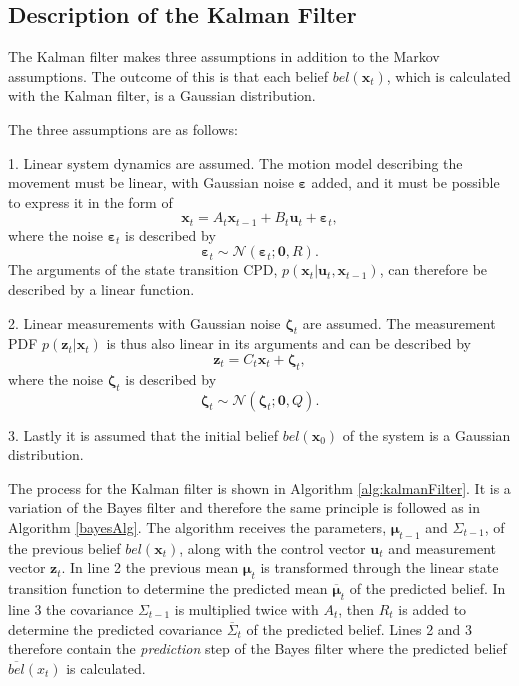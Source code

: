 \documentclass[12pt,oneside,openany,a4paper, %
afrikaans,english,
]{memoir}
\numberwithin{equation}{chapter}
\begin{document}
{\subsection{Description of the Kalman Filter}
The Kalman filter makes three assumptions in addition to the Markov assumptions. The outcome of this is that each belief $bel(\bm{x}_t)$, which is calculated with the Kalman filter, is a Gaussian distribution.

The three assumptions are as follows:

1. Linear system dynamics are assumed. The motion model describing the movement must be linear, with Gaussian noise $\bm{\varepsilon}$ added, and it must be possible to express it in the form of
\begin{equation}\label{eq:linearKmm}
\bm{x}_t = A_t \bm{x}_{t - 1} + B_t \bm{u}_t + \bm{\varepsilon}_t,
\end{equation}
where the noise $\bm{\varepsilon}_t$ is described by 
\begin{equation}
\bm{\varepsilon}_t \sim \mathcal{N}(\bm{\varepsilon}_t; \bm{0}, R).
\end{equation}
The arguments of the state transition CPD, $p(\bm{x}_t|\bm{u}_t, \bm{x}_{t-1})$, can therefore be described by a linear function.

2. Linear measurements with Gaussian noise $\bm{\zeta}_t$ are assumed. The measurement PDF $p(\bm{z}_t|\bm{x}_t)$ is thus also linear in its arguments and can be described by
\begin{equation}
\bm{z}_t = C_t \bm{x}_t + \bm{\zeta}_t,
\end{equation} 
where the noise $\bm{\zeta}_t$ is described by
\begin{equation}\label{eq:linearMeasurements}
\bm{\zeta}_t \sim \mathcal{N}(\bm{\zeta}_t; \bm{0}, Q).
\end{equation}

3. Lastly it is assumed that the initial belief $bel(\bm{x}_0)$ of the system is a Gaussian distribution.

The process for the Kalman filter is shown in Algorithm \ref{alg:kalmanFilter}. It is a variation of the Bayes filter and therefore the same principle is followed as in Algorithm \ref{bayesAlg}. The algorithm receives the parameters, $\bm{\mu}_{t-1}$ and $\Sigma_{t-1}$, of the previous belief $bel(\bm{x}_t)$, along with the control vector $\bm{u}_t$ and measurement vector $\bm{z}_t$. In line 2 the previous mean $\bm{\mu}_t$ is transformed through the linear state transition function to determine the predicted mean $\overline{\bm{\mu}}_t$ of the predicted belief. In line 3 the covariance $\Sigma_{t-1}$ is multiplied twice with $A_t$, then $R_t$ is added to determine the predicted covariance $\overline{\Sigma}_t$ of the predicted belief. Lines 2 and 3 therefore contain the \textit{prediction} step of the Bayes filter where the predicted belief $\overline{bel}(x_t)$ is calculated. 

}
\end{document}
